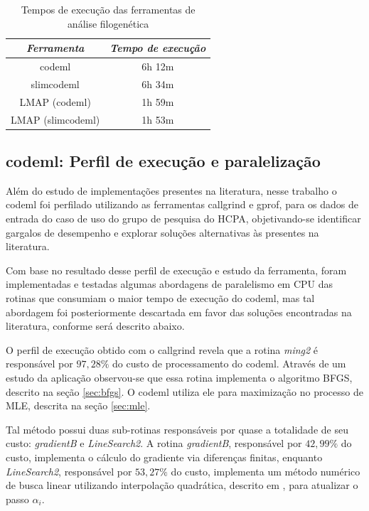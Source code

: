 \documentclass[cic,tc]{iiufrgs}
\begin{document}
\begin{table}[h]
    \caption{Tempos de execução das ferramentas de análise filogenética}
    \centering
        \begin{tabular}{c|c}
          \hline
          \textit{Ferramenta}  &   \textit{Tempo de execução} \\
          \hline
          \hline
          codeml & 6h 12m \\
          slimcodeml & 6h 34m \\
          LMAP (codeml) & 1h 59m \\
          LMAP (slimcodeml) & 1h 53m \\
          \hline
        \end{tabular}
    \label{tbl:paml}
\end{table}

\subsection{codeml: Perfil de execução e paralelização}
\label{subsec:codemlpar}

Além do estudo de implementações presentes na literatura, nesse trabalho o
codeml foi perfilado utilizando as ferramentas callgrind e gprof, para os dados
de entrada do caso de uso do grupo de pesquisa do HCPA, objetivando-se
identificar gargalos de desempenho e explorar soluções alternativas às
presentes na literatura.

Com base no resultado desse perfil de execução e estudo da ferramenta, foram
implementadas e testadas algumas abordagens de paralelismo em CPU das rotinas
que consumiam o maior tempo de execução do codeml, mas tal abordagem foi
posteriormente descartada em favor das soluções encontradas na literatura,
conforme será descrito abaixo. 

O perfil de execução obtido com o callgrind revela que a rotina \textit{ming2}
é responsável por $97,28\%$ do custo de processamento do codeml. Através de um
estudo da aplicação observou-se que essa rotina implementa o algoritmo BFGS,
descrito na seção \ref{sec:bfgs}. O codeml utiliza ele para maximização no
processo de MLE, descrita na seção \ref{sec:mle}.

Tal método possui duas sub-rotinas responsáveis por quase a totalidade de seu
custo: \textit{gradientB} e \textit{LineSearch2}. A rotina \textit{gradientB},
responsável por $42,99\%$ do custo, implementa o cálculo do gradiente via
diferenças finitas, enquanto \textit{LineSearch2}, responsável por $53,27\%$ do
custo, implementa um método numérico de busca linear utilizando interpolação
quadrática, descrito em \cite{wolfe1978numerical}, para atualizar o passo
$\alpha_i$.
\end{document}

